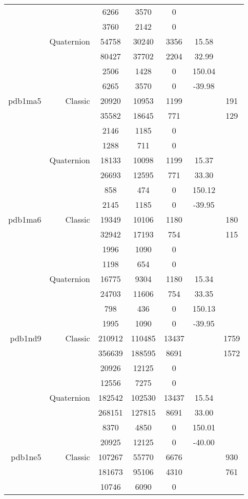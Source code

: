 \begin{xltabular}{\textwidth}{r|rcccSc}
& & 6266 & 3570 & 0 & & \\
& & 3760 & 2142 & 0 & & \\
& Quaternion & 54758 & 30240 & 3356 & 15.58 & \\
& & 80427 & 37702 & 2204 & 32.99 & \\
& & 2506 & 1428 & 0 & 150.04 & \\
& & 6265 & 3570 & 0 & -39.98 & \\ \addlinespace
pdb1ma5 & Classic & 20920 & 10953 & 1199 & & 191 \\
& & 35582 & 18645 & 771 & & 129 \\
& & 2146 & 1185 & 0 & & \\
& & 1288 & 711 & 0 & & \\
& Quaternion & 18133 & 10098 & 1199 & 15.37 & \\
& & 26693 & 12595 & 771 & 33.30 & \\
& & 858 & 474 & 0 & 150.12 & \\
& & 2145 & 1185 & 0 & -39.95 & \\ \addlinespace
pdb1ma6 & Classic & 19349 & 10106 & 1180 & & 180 \\
& & 32942 & 17193 & 754 & & 115 \\
& & 1996 & 1090 & 0 & & \\
& & 1198 & 654 & 0 & & \\
& Quaternion & 16775 & 9304 & 1180 & 15.34 & \\
& & 24703 & 11606 & 754 & 33.35 & \\
& & 798 & 436 & 0 & 150.13 & \\
& & 1995 & 1090 & 0 & -39.95 & \\ \addlinespace
pdb1nd9 & Classic & 210912 & 110485 & 13437 & & 1759 \\
& & 356639 & 188595 & 8691 & & 1572 \\
& & 20926 & 12125 & 0 & & \\
& & 12556 & 7275 & 0 & & \\
& Quaternion & 182542 & 102530 & 13437 & 15.54 & \\
& & 268151 & 127815 & 8691 & 33.00 & \\
& & 8370 & 4850 & 0 & 150.01 & \\
& & 20925 & 12125 & 0 & -40.00 & \\ \addlinespace
pdb1ne5 & Classic & 107267 & 55770 & 6676 & & 930 \\
& & 181673 & 95106 & 4310 & & 761 \\
& & 10746 & 6090 & 0 & & \\

\end{xltabular}
